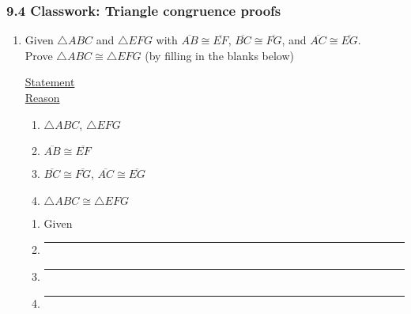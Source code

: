 \documentclass[12pt, twoside]{article}
\begin{document}
\subsubsection*{9.4 Classwork: Triangle congruence proofs}
  \begin{enumerate}
 
  \item Given $\triangle ABC$ and $\triangle EFG$ with $\overline{AB} \cong \overline{EF}$, $\overline{BC} \cong \overline{FG}$, and $\overline{AC} \cong \overline{EG}$. \\Prove $\triangle ABC \cong \triangle EFG$ (by filling in the blanks below)\\[0.5cm]
    \begin{multicols}{2}
      \underline{Statement} \\
      \underline{Reason}
    \end{multicols}
    \begin{multicols}{2}
      \raggedcolumns
      \begin{enumerate}[label={\arabic*)}]
        \item $\triangle ABC$, $\triangle EFG$
        \item $\overline{AB} \cong \overline{EF}$
        \item $\overline{BC} \cong \overline{FG}$, $\overline{AC} \cong \overline{EG}$
        \item $\triangle ABC \cong \triangle EFG$
      \end{enumerate}
      \begin{enumerate}[label={\arabic*)}]
        \item Given
        \item \rule{4cm}{0.15mm}
        \item \rule{4cm}{0.15mm}
        \item \rule{4cm}{0.15mm}
      \end{enumerate}
    \end{multicols}
 

\end{enumerate}
\end{document}
